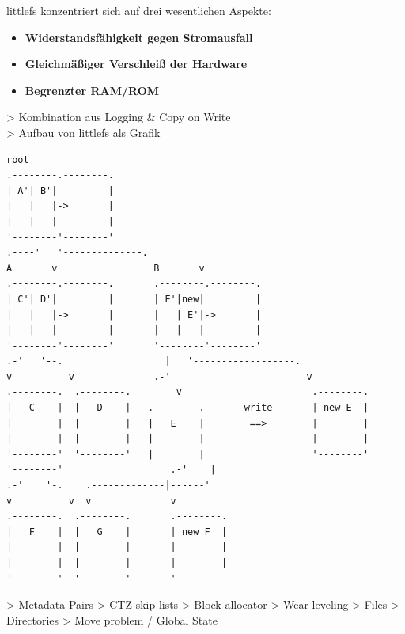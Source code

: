 
littlefs konzentriert sich auf drei wesentlichen Aspekte:
\begin{itemize}
	\item \textbf{Widerstandsfähigkeit gegen Stromausfall}
	\item \textbf{Gleichmäßiger Verschleiß der Hardware}
	\item \textbf{Begrenzter RAM/ROM}
\end{itemize}


> Kombination aus Logging \& Copy on Write\\
> Aufbau von littlefs als Grafik\\
\begin{lstlisting}[basicstyle=\tiny]
                 root
.--------.--------.
| A'| B'|         |
|   |   |->       |
|   |   |         |
'--------'--------'
.----'   '--------------.
A       v                 B       v
.--------.--------.       .--------.--------.
| C'| D'|         |       | E'|new|         |
|   |   |->       |       |   | E'|->       |
|   |   |         |       |   |   |         |
'--------'--------'       '--------'--------'
.-'   '--.                  |   '------------------.
v          v              .-'                        v
.--------.  .--------.        v                       .--------.
|   C    |  |   D    |   .--------.       write       | new E  |
|        |  |        |   |   E    |        ==>        |        |
|        |  |        |   |        |                   |        |
'--------'  '--------'   |        |                   '--------'
'--------'                   .-'    |
.-'    '-.    .-------------|------'
v          v  v              v
.--------.  .--------.       .--------.
|   F    |  |   G    |       | new F  |
|        |  |        |       |        |
|        |  |        |       |        |
'--------'  '--------'       '--------
\end{lstlisting}
> Metadata Pairs
> CTZ skip-lists
> Block allocator
> Wear leveling
> Files
> Directories
> Move problem / Global State

